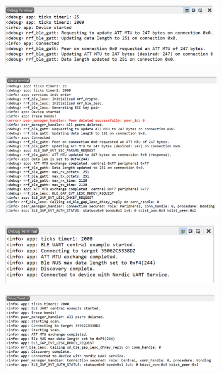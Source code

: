 \documentclass{Configuration_Files/PoliMi3i_thesis}
\begin{document}
\begin{figure}[h]
    \centering
    \includegraphics[scale=0.3]{Firmware_security/Screenshot 2024-07-22 at 22.33.24.png}
\end{figure}

\begin{figure}[h]
    \centering
    \includegraphics[scale=0.3]{Firmware_security/Screenshot 2024-07-22 at 22.33.31.png}
\end{figure}

\begin{figure}[h]
    \centering
    \includegraphics[scale=0.3]{Firmware_security/Screenshot 2024-07-22 at 22.33.37.png}
\end{figure}

\begin{figure}[h]
    \centering
    \includegraphics[scale=0.3]{Firmware_security/Screenshot 2024-07-22 at 22.33.43.png}
\end{figure}
\end{document}
